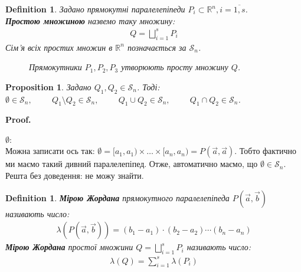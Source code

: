 \documentclass[a4paper, 10pt]{article}
\makeatletter
\def\huge{\displaystyle}
\def\qed{$\blacksquare$}
\theoremstyle{theoremdd}
\theoremstyle{theoremdd}
\newtheorem{definition}[theorem]{Definition}
\theoremstyle{theoremdd}
\theoremstyle{theoremdd}
\theoremstyle{theoremdd}
\newtheorem{proposition}[theorem]{Proposition}
\theoremstyle{theoremdd}
\theoremstyle{theoremdd}
\theoremstyle{theoremdd}
\renewenvironment{proof}[1][Proof.\\]{\par
\pushQED{\hfill \qed}%
\normalfont \topsep6\p@\@plus6\p@\relax
\trivlist
\item\relax
{\bfseries
#1\@addpunct{.}}\hspace\labelsep\ignorespaces
}{%
\popQED\endtrivlist\@endpefalse
}
\makeatother
\begin{document}
\begin{definition}
Задано прямокутні паралелепіпеди $P_i \subset \mathbb{R}^n, i = \overline{1,s}$.\\
\textbf{Простою множиною} назвемо таку множину:
\begin{align*}
Q = \bigsqcup_{i=1}^s P_i
\end{align*}
Сім'я всіх простих множин в $\mathbb{R}^n$ позначається за $\mathcal{S}_n$.
\begin{figure}[H]
\centering
{}
\caption*{Прямокутники $P_1,P_2,P_3$ утворюють просту множину $Q$.}
\end{figure}
\end{definition}

\begin{proposition}
Задано $Q_1,Q_2 \in \mathcal{S}_n$. Тоді:\\
$\emptyset \in \mathcal{S}_n, \hspace{1cm} Q_1 \setminus Q_2 \in \mathcal{S}_n, \hspace{1cm} Q_1 \cup Q_2 \in \mathcal{S}_n, \hspace{1cm} Q_1 \cap Q_2 \in \mathcal{S}_n$.
\end{proposition}

\begin{proof}
$\emptyset$:\\
Можна записати ось так: $\emptyset = [a_1,a_1) \times \dots \times [a_n,a_n) = P(\vec{a},\vec{a})$. Тобто фактично ми маємо такий дивний паралелепіпед. Отже, автоматично маємо, що $\emptyset \in \mathcal{S}_n$.
\bigskip \\
Решта без доведення: не можу знайти.
\end{proof}

\begin{definition}
\textbf{Мірою Жордана} прямокутного паралелепіпеда $P(\vec{a},\vec{b})$ називають число:
\begin{align*}
\lambda (P(\vec{a},\vec{b})) = (b_1-a_1)\cdot (b_2-a_2) \cdots (b_n-a_n)
\end{align*}
\textbf{Мірою Жордана} простої множини $Q = \huge\bigsqcup_{i=1}^s P_i$ називають число:
\begin{align*}
\lambda (Q) = \huge\sum_{i=1}^s \lambda (P_i)
\end{align*}
\end{definition}
\end{document}
